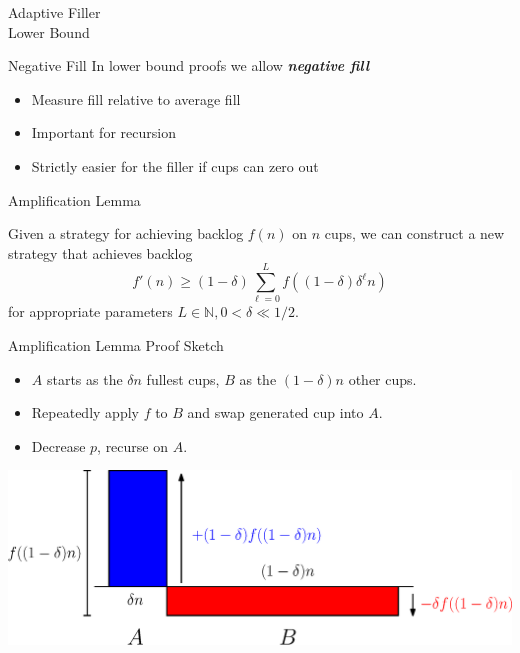 \documentclass[xcolor=x11names, svgnames, rgb]{beamer}
\newcommand{\defn}[1]       {{\textit{\textbf{\boldmath #1}}}}
\begin{document}
\begin{frame}[c]{}
\begin{center}
\Huge Adaptive Filler\\ Lower Bound
\end{center}
\end{frame}

\begin{frame}[t]{Negative Fill}
  In lower bound proofs we allow \defn{negative fill}
  \begin{itemize}
    \item Measure fill relative to average fill
    \item Important for recursion 
    \item Strictly easier for the filler if cups can zero out
  \end{itemize}
\end{frame}

\begin{frame}[t]{Amplification Lemma}
  \begin{lemma}
    Given a strategy for achieving backlog $f(n)$ on $n$ cups, we can construct a new strategy that achieves backlog 
    $$f'(n) \ge (1-\delta)\sum_{\ell=0}^L f((1-\delta)\delta^\ell n)$$
    for appropriate parameters $L\in\mathbb{N}, 0<\delta\ll 1/2$.
  \end{lemma}
\end{frame}

\begin{frame}[t]{Amplification Lemma Proof Sketch}
  \begin{itemize}
    \item $A$ starts as the $\delta n$ fullest cups, $B$ as the $(1-\delta)n$ other cups.
    \item Repeatedly apply $f$ to $B$ and swap generated cup into $A$. 
    \item Decrease $p$, recurse on $A$.
  \end{itemize} 
  \vspace{0.5cm}
  \includegraphics[width=\linewidth]{amplificationImgs/delta_one_minus_delta.eps}
\end{frame}
\end{document}
